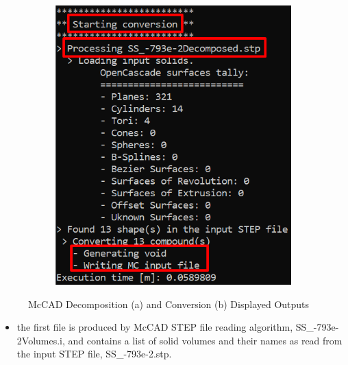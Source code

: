 \documentclass[12pt, a4paper, titlepage]{article}
\begin{document}
\begin{enumerate}
\begin{figure}[h!]
\begin{subfigure}{.5\textwidth}
  		\includegraphics[width=.8\linewidth]{figures/McCAD_output_conversion.png}
  		\caption{}
  		\label{fig:b}
  	\end{subfigure}
  	\caption{McCAD Decomposition (a) and Conversion (b) Displayed Outputs}
  	\label{fig:McCAD Decomposition and Conversion Outputs}
  \end{figure}

  \begin{itemize}
  	\item the first file is produced by McCAD STEP file reading algorithm, SS\_-793e-2Volumes.i, and contains a list of solid volumes and their names as read from the input STEP file, SS\_-793e-2.stp.
  	

\end{itemize}
\end{enumerate}
\end{document}
